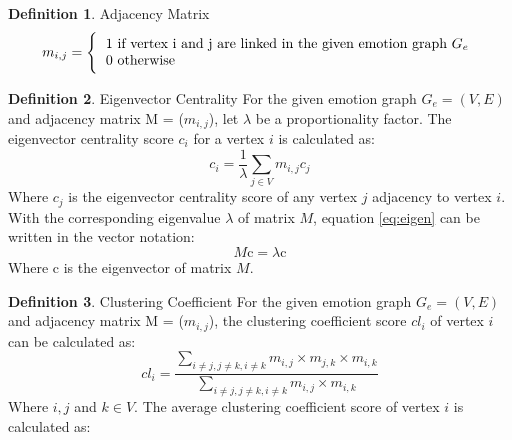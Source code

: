 \documentclass[12pt,a4paper]{report}
\theoremstyle{definition}
\newtheorem{definition}{Definition}[chapter]
\begin{document}
\begin{CJK}{UTF8}{bsmi}
\begin{definition}{Adjacency Matrix}
    \begin{equation}
        m_{i,j} = \Bigg\{
        \begin{tabular}{l}
        1  if vertex i and j are linked in the given emotion graph \(G_e\)\\
        0  otherwise
        \end{tabular}
    \end{equation}
    \end{definition}
    \theoremstyle{definition}
    \begin{definition}{Eigenvector Centrality}
    \newline
    For the given emotion graph \(G_e = (V,E)\) and adjacency matrix M = (\(m_{i,j}\)), let \(\lambda\) be a proportionality factor. The eigenvector centrality score \(c_i\) for a vertex \(i\) is calculated as:
    \newline
    \begin{equation}
        \label{eq:eigen}
        c_i = \frac{1}{\lambda}\sum_{j \in V} m_{i,j}c_j
    \end{equation}
    \newline
    Where \(c_j\) is the eigenvector centrality score of any vertex \(j\) adjacency to vertex \(i\).
    With the corresponding eigenvalue \(\lambda\) of matrix \(M\), equation \ref{eq:eigen} can be written in the vector notation:
    \newline
    \begin{equation}
        M \text{c} = \lambda \text{c}
    \end{equation}
    \newline
    Where c is the eigenvector of matrix \(M\).
    \end{definition}
    \theoremstyle{definition}
    \begin{definition}{Clustering Coefficient}
    \newline
    For the given emotion graph \(G_e = (V,E)\) and adjacency matrix M = (\(m_{i,j}\)), the clustering coefficient score \(cl_i\) of vertex \(i\) can be calculated as:
    \newline
    \begin{equation}
        cl_i = \frac{\sum_{i \neq j, j \neq k, i \neq k} m_{i,j} \times m_{j,k} \times m_{i,k}}{\sum_{i \neq j, j \neq k, i \neq k}m_{i,j} \times m_{i,k}} 
    \end{equation}
    Where \(i, j\) and \(k \in V\). The average clustering coefficient score of vertex \(i\) is calculated as:
    \newline
    \begin{equation}

\end{equation}
\end{definition}
\end{CJK}
\end{document}
